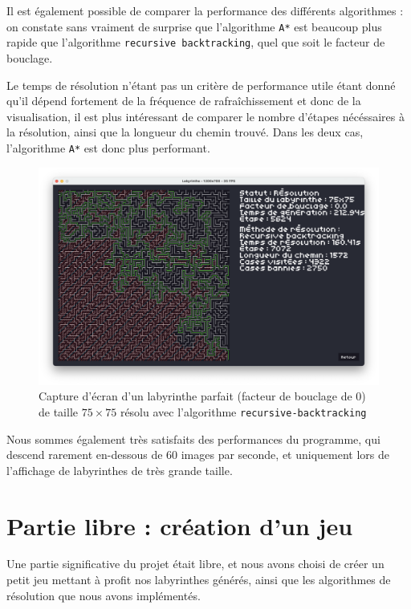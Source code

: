 \documentclass[12pt]{scrreprt} %
\begin{document}
Il est également possible de comparer la performance des différents algorithmes : on constate sans vraiment de surprise que l'algorithme \texttt{A*} est beaucoup plus rapide que l'algorithme \texttt{recursive backtracking}, quel que soit le facteur de bouclage.

Le temps de résolution n'étant pas un critère de performance utile étant donné qu'il dépend fortement de la fréquence de rafraîchissement et donc de la visualisation, il est plus intéressant de comparer le nombre d'étapes nécéssaires à la résolution, ainsi que la longueur du chemin trouvé. Dans les deux cas, l'algorithme \texttt{A*} est donc plus performant.


\begin{figure}[h]
    \centering
    \includegraphics[width=\textwidth]{images/recbacksolved75.png}
    \caption{Capture d'écran d'un labyrinthe parfait (facteur de bouclage de $0$) de taille $75 \times 75$ résolu avec l'algorithme \texttt{recursive-backtracking}}
\end{figure}

Nous sommes également très satisfaits des performances du programme, qui descend rarement en-dessous de 60 images par seconde, et uniquement lors de l'affichage de labyrinthes de très grande taille.

\section{Partie libre : création d'un jeu}

Une partie significative du projet était libre, et nous avons choisi de créer un petit jeu mettant à profit nos labyrinthes générés, ainsi que les algorithmes de résolution que nous avons implémentés.
\end{document}
